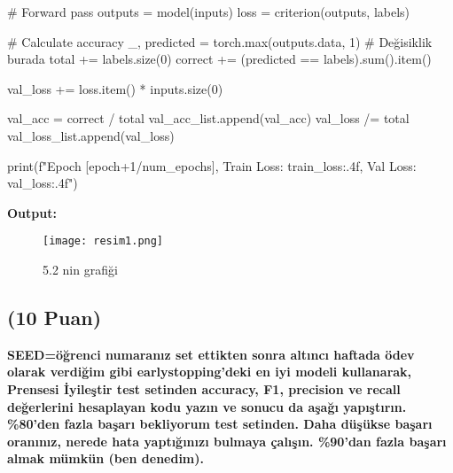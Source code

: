 \documentclass[11pt]{article}
\begin{document}
\begin{python}
            # Forward pass
            outputs = model(inputs)
            loss = criterion(outputs, labels)

            # Calculate accuracy
            _, predicted = torch.max(outputs.data, 1)  # Değisiklik burada
            total += labels.size(0)
            correct += (predicted == labels).sum().item()
            
            val_loss += loss.item() * inputs.size(0)

        val_acc = correct / total
        val_acc_list.append(val_acc)
        val_loss /= total
        val_loss_list.append(val_loss)

        print(f"Epoch [{epoch+1}/{num_epochs}], Train Loss: {train_loss:.4f}, Val Loss: {val_loss:.4f}")


\end{python}

\textbf{Output:}
\begin{figure}[ht!]
    \centering
    \texttt{[image: resim1.png]}
    \caption{5.2  nin grafiği}
    \label{fig:my_pic}
\end{figure}
\newpage


\subsection{(10 Puan)} \textbf{SEED=öğrenci numaranız set ettikten sonra altıncı haftada ödev olarak verdiğim gibi earlystopping'deki en iyi modeli kullanarak, Prensesi İyileştir test setinden accuracy, F1, precision ve recall değerlerini hesaplayan kodu yazın ve sonucu da aşağı yapıştırın. \%80'den fazla başarı bekliyorum test setinden. Daha düşükse başarı oranınız, nerede hata yaptığınızı bulmaya çalışın. \%90'dan fazla başarı almak mümkün (ben denedim).}
\end{document}
